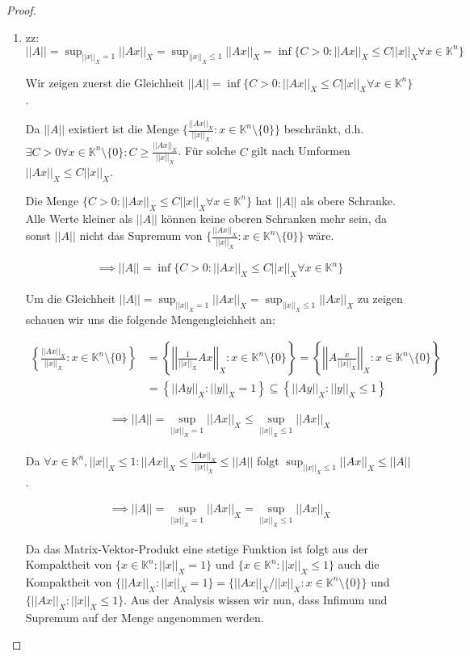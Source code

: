\documentclass[]{article}
\newcommand{\norm}[1]{\left|\left|#1\right|\right|}
\newcommand{\normx}[1]{\norm{#1}_X}
\newcommand{\supo}{\sup_{\normx{x}=1}}
\newcommand{\supl}{\sup_{\normx{x}\leq1}}
\begin{document}
\begin{proof}
\begin{enumerate}[label=\alph*)]
		\item zz: $\norm{A}=\supo\normx{Ax}=\supl\normx{Ax}=\inf\{C>0: \normx{Ax}\leq C\normx{x} \forall x \in \mathbb{K}^n\}$
		
		Wir zeigen zuerst die Gleichheit $\norm{A}=\inf\{C>0: \normx{Ax}\leq C\normx{x} \forall x \in \mathbb{K}^n\}$.
		
		Da $\norm{A}$ existiert ist die Menge $\{\frac{\normx{Ax}}{\normx{x}}:x\in\mathbb{K}^n\setminus\{0\}\}$ beschränkt, d.h. $\exists C>0 \forall x\in\mathbb{K}^n\setminus\{0\} : C \geq \frac{\normx{Ax}}{\normx{x}}$. Für solche $C$ gilt nach Umformen $\normx{Ax}\leq C\normx{x}$.
		
		Die Menge $\{C>0:\normx{Ax}\leq C\normx{x} \forall x \in \mathbb{K}^n\}$ hat $\norm{A}$ als obere Schranke. Alle Werte kleiner als $\norm{A}$ können keine oberen Schranken mehr sein, da sonst $\norm{A}$ nicht das Supremum von $\{\frac{\normx{Ax}}{\normx{x}}:x\in\mathbb{K}^n\setminus\{0\}\}$ wäre.
		
		\begin{align*}
			\implies \norm{A} = \inf\{C>0: \normx{Ax}\leq C\normx{x} \forall x \in \mathbb{K}^n\}
		\end{align*}
	
		Um die Gleichheit $\norm{A}=\supo\normx{Ax}=\supl\normx{Ax}$ zu zeigen schauen wir uns die folgende Mengengleichheit an:
	
		\begin{align*}
			\left\{\frac{\normx{Ax}}{\normx{x}}:x\in\mathbb{K}^n\setminus\{0\}\right\} &= \left\{\normx{\frac{1}{\normx{x}}Ax}:x\in\mathbb{K}^n\setminus\{0\}\right\} = \left\{\normx{A\frac{x}{\normx{x}}}:x\in\mathbb{K}^n\setminus\{0\}\right\} \\
			&= \left\{\normx{Ay}:\normx{y}=1\right\} \subseteq \left\{\normx{Ay}:\normx{y}\leq1\right\}
		\end{align*}
	
		\begin{align*}
			\implies \norm{A}=\supo\normx{Ax}\leq\supl\normx{Ax}
		\end{align*}
	
		Da $\forall x \in \mathbb{K}^n, \normx{x}\leq 1: \normx{Ax} \leq \frac{\normx{Ax}}{\normx{x}} \leq \norm{A}$ folgt $\supl\normx{Ax}\leq \norm{A}$.
		
		\begin{align*}
			\implies \norm{A} = \supo\normx{Ax} = \supl\normx{Ax}
		\end{align*}
	
		Da das Matrix-Vektor-Produkt eine stetige Funktion ist folgt aus der Kompaktheit von $\{x\in\mathbb{K}^n: \normx{x}=1\}$ und $\{x\in\mathbb{K}^n: \normx{x}\leq 1\}$ auch die Kompaktheit von $\{\normx{Ax}: \normx{x}=1\} = \{\normx{Ax}/\normx{x}: x \in \mathbb{K}^n\setminus\{0\}\}$ und $\{\normx{Ax}: \normx{x} \leq 1\}$. Aus der Analysis wissen wir nun, dass Infimum und Supremum auf der Menge angenommen werden.
	

\end{enumerate}
\end{proof}
\end{document}
